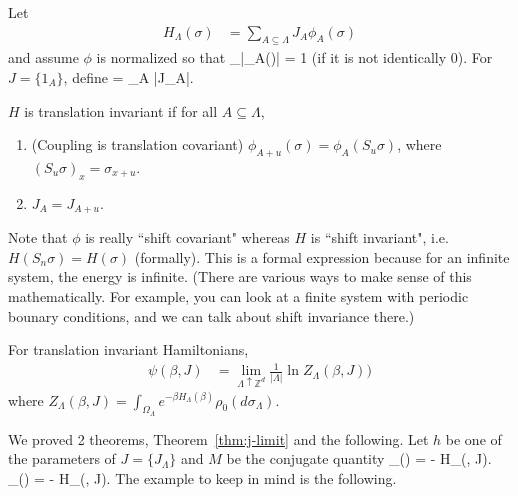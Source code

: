 \documentclass[12pt]{book}
\theoremstyle{norm}
\begin{document}
Let
\begin{align*}
H_\Lambda(\sigma)&=\sum_{A\subseteq \Lambda} J_A\phi_A(\sigma)
\end{align*}
and assume $\phi$ is normalized so that 
\be
\sup_\sigma |\phi_A(\sigma)|  = 1
\ee
(if it is not identically 0). For $J=\{1_A\}$, define 
\be
\left{}\right\Vert = \sum_{A}  |J_A|.
\ee
\begin{definition}
$H$ is translation invariant if for all $A\subseteq \Lambda$,
\begin{enumerate}
\item
(Coupling is translation covariant)
$\phi_{A+u}(\sigma) = \phi_A(S_u\sigma)$, where $(S_u\sigma)_x = \sigma_{x+u}$. 
\item
$J_A=J_{A+u}$.
\end{enumerate}
\end{definition}
Note that $\phi$ is really ``shift covariant" whereas $H$ is ``shift invariant", i.e. $H(S_n\sigma) = H(\sigma)$ (formally). This is a formal expression because for an infinite system, the energy is infinite. (There are various ways to make sense of this mathematically. For example, you can look at a finite system with periodic bounary conditions, and we can talk about shift invariance there.)

For translation invariant Hamiltonians,
\begin{align*}
\psi(\beta, J) &=\lim_{\Lambda \uparrow \mathbb{Z}^d} \frac{1}{|\Lambda|} \ln Z_{\Lambda} (\beta, J))
\end{align*}
where $Z_{\Lambda}(\beta, J) = \int_{\Omega_\Lambda} e^{-\beta H_{\Lambda}(\beta)}\rho_0(d\sigma_{\Lambda})$.

We proved 2 theorems, Theorem~\ref{thm:j-limit} and the following.
Let $h$ be one of the parameters of $J=\{J_\Lambda\}$ and $M$ be the conjugate quantity 
\beM_\Lambda(\sigma) = - H_{\Lambda}(\beta, J).\ee
\beM_\Lambda(\sigma) = - H_{\Lambda}(\beta, J).\ee
The example to keep in mind is the following.
\end{document}
